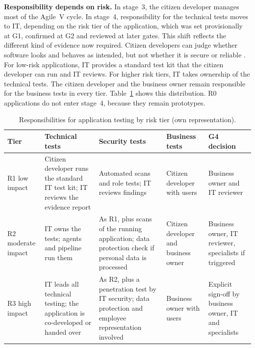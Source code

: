 \documentclass[10pt,a4paper]{article}
\begin{document}
\textbf{Responsibility depends on risk.} In stage~3, the citizen developer
manages most of the Agile~V cycle. In stage~4, responsibility for the
technical tests moves to IT, depending on the risk tier of the application, which was set provisionally
at G1, confirmed at G2 and reviewed at later gates. This shift reflects the different kind of evidence
now required. Citizen developers can judge whether software looks and behaves
as intended, but not whether it is secure or reliable
\parencite{kobiella2026}. For low-risk applications, IT provides a standard
test kit that the citizen developer can run and IT reviews. For higher risk
tiers, IT takes ownership of the technical tests. The citizen developer and
the business owner remain responsible for the business tests in every tier.
Table~\ref{tab:g4-responsibility} shows this distribution. R0 applications do
not enter stage~4, because they remain prototypes.

\begin{table}[H]
    \centering
    \small
    \caption{Responsibilities for application testing by risk tier (own
    representation).}
    \label{tab:g4-responsibility}
    \begin{tabular}{p{1.8cm} p{3.3cm} p{3.3cm} p{2.4cm} p{2.6cm}}
    \hline
    \textbf{Tier} & \textbf{Technical tests} & \textbf{Security tests} &
        \textbf{Business tests} & \textbf{G4 decision} \\
    \hline
    R1 low impact & Citizen developer runs the standard IT test kit; IT reviews
        the evidence report & Automated scans and role tests; IT reviews
        findings & Citizen developer with users & Business owner and IT
        reviewer \\
    R2 moderate impact & IT owns the tests; agents and pipeline run them & As R1,
        plus scans of the running application; data protection check if
        personal data is processed & Citizen developer and business owner &
        Business owner, IT reviewer, specialists if triggered \\
    R3 high impact & IT leads all technical testing; the application is
        co-developed or handed over & As R2, plus a penetration test by IT
        security; data protection and employee representation involved &
        Business owner with users & Explicit sign-off by business owner, IT
        and specialists \\
    \hline
    \end{tabular}
\end{table}
\end{document}
